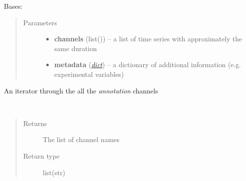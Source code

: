 \documentclass[letterpaper,10pt,english]{sphinxmanual}
\begin{document}
\begin{fulllineitems}
\label{pyrem.polygram:pyrem.polygram.Polygram}
Bases: 
\begin{quote}\begin{description}
\item[{Parameters}] \leavevmode\begin{itemize}
\item {} 
\textbf{channels} (list()) -- a list of time series with approximately the same duration

\item {} 
\textbf{metadata} (\href{http://docs.python.org/2.7/library/stdtypes.html\#dict}{\emph{dict}}) -- a dictionary of additional information (e.g. experimental variables)

\end{itemize}

\end{description}\end{quote}

\begin{fulllineitems}
\label{pyrem.polygram:pyrem.polygram.Polygram.annotation_channels}
An iterator through the all the \emph{annotation} channels

\end{fulllineitems}


\begin{fulllineitems}
\label{pyrem.polygram:pyrem.polygram.Polygram.channel_names}~\begin{quote}\begin{description}
\item[{Returns}] \leavevmode
The list of channel names

\item[{Return type}] \leavevmode
list(str)

\end{description}\end{quote}

\end{fulllineitems}



\end{fulllineitems}
\end{document}
